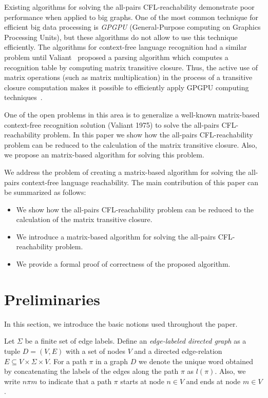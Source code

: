 \documentclass[runningheads,a4paper]{llncs}
\begin{document}
Existing algorithms for solving the all-pairs CFL-reachability demonstrate poor performance when applied to big graphs. One of the most common technique for efficient big data processing is \textit{GPGPU} (General-Purpose computing on Graphics Processing Units), but these algorithms do not allow to use this technique efficiently. The algorithms for context-free language recognition had a similar problem until Valiant~\cite{valiant} proposed a parsing algorithm which computes a recognition table by computing matrix transitive closure. Thus, the active use of matrix operations (such as matrix multiplication) in the process of a transitive closure computation makes it possible to efficiently apply GPGPU computing techniques~\cite{matricesOnGPGPU}.

One of the open problems in this area is to generalize a well-known matrix-based context-free recognition solution (Valiant 1975) to solve the all-pairs CFL-reachability problem. In this paper we show how the all-pairs CFL-reachability problem can be reduced to the calculation of the matrix transitive closure. Also, we propose an matrix-based algorithm for solving this problem.

We address the problem of creating a matrix-based algorithm for solving the all-pairs context-free language reachability. The main contribution of this paper can be summarized as follows:
\begin{itemize}
	\item We show how the all-pairs CFL-reachability problem can be reduced to the calculation of the matrix transitive closure.
	\item We introduce a matrix-based algorithm for solving the all-pairs CFL-reachability problem.
	\item We provide a formal proof of correctness of the proposed algorithm.
\end{itemize}

\section{Preliminaries} \label{section_preliminaries}%
In this section, we introduce the basic notions used throughout the paper.

Let $\Sigma$ be a finite set of edge labels. Define an \textit{edge-labeled directed graph} as a tuple $D = (V, E)$ with a set of nodes $V$ and a directed edge-relation $E \subseteq V \times \Sigma \times V$.  For a path $\pi$ in a graph $D$ we denote the unique word obtained by concatenating the labels of the edges along the path $\pi$ as $l(\pi)$. Also, we write $n \pi m$ to indicate that a path $\pi$ starts at node $n \in V$ and ends at node $m \in V$.
\end{document}
